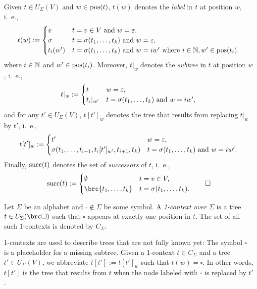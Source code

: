 \begin{definition}
 Given $t\in U_\Sigma(V)$ and $w\in\operatorname{pos}(t)$, $t(w)$ denotes the \emph{label} in $t$ at position $w$, i.~e.,
 \[
  t(w) := \begin{cases}
   v & t = v\in V \text{ and } w=\varepsilon, \\
   \sigma & t = \sigma(t_1,\ldots,t_k) \text{ and } w = \varepsilon, \\
   t_i(w') & t = \sigma(t_1,\ldots,t_k) \text{ and } w = iw' \text{ where } i\in\mathbb N, w'\in\operatorname{pos}(t_i).
  \end{cases}
 \]
 where $i\in\mathbb N$ and $w'\in\operatorname{pos}(t_i)$. Moreover, $t|_w$ denotes the \emph{subtree} in $t$ at position $w$, i.~e.,
 \[
  t|_w := \begin{cases}
   t & w = \varepsilon, \\
   t_i|_{w'} & t = \sigma(t_1,\ldots,t_k) \text{ and } w = iw',
  \end{cases}
 \]
 and for any $t'\in U_\Sigma(V)$, $t[t']_w$ denotes the tree that results from replacing $t|_w$ by $t'$, i.~e.,
 \[
  t[t']_w := \begin{cases}
   t' & w = \varepsilon, \\
   \sigma(t_1,\ldots,t_{i-1},t_i[t']_{w'},t_{i+1},t_k) & t = \sigma(t_1,\ldots,t_k) \text{ and } w = iw'.
  \end{cases}
 \]
 Finally, $\operatorname{succ}(t)$ denotes the set of \emph{successors} of $t$, i.~e.,
 \[
  \osucc(t) := \begin{cases}
   \emptyset & t = v\in V, \\
   \brc{t_1,\ldots,t_k} & t = \sigma(t_1,\ldots,t_k).
  \end{cases}
  \qedhere
 \]
\end{definition}

\begin{definition}
 Let $\Sigma$ be an alphabet and $\square\notin\Sigma$ be some symbol. A
 \emph{1-context over $\Sigma$} is a tree $t\in U_\Sigma(\brc\square)$ such
 that $\square$ appears at exactly one position in $t$. The set of all such
 1-contexts is denoted by $C_\Sigma$.
\end{definition}

\pagebreak

1-contexts are used to describe trees that are not fully known yet: The
symbol $\square$ is a placeholder for a missing subtree. Given a 1-context
$t\in C_\Sigma$ and a tree $t'\in U_\Sigma(V)$, we abbreviate $t[t'] :=
t[t']_w$ such that $t(w) = \square$. In other words, $t[t']$ is the tree that
results from $t$ when the node labeled with $\square$ is replaced by $t'$.

